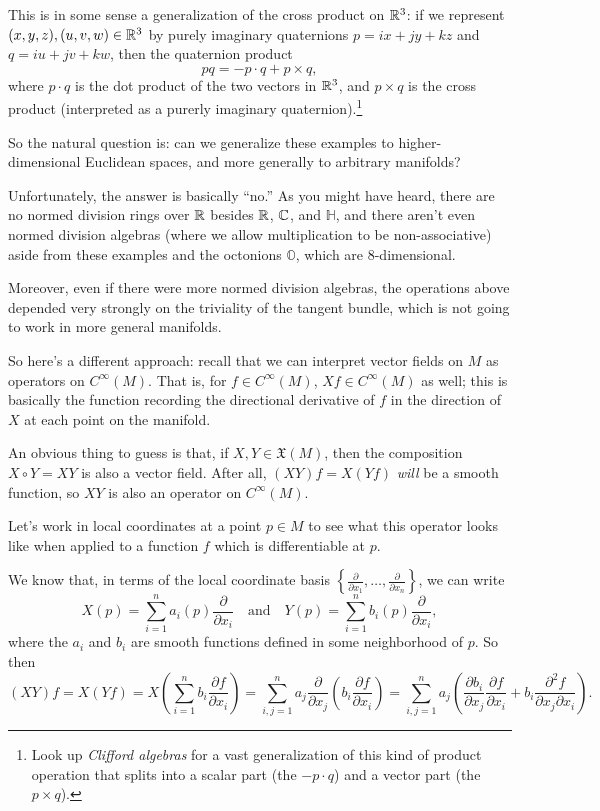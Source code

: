 \begin{itemize}
	This is in some sense a generalization of the cross product on $\mathbb{R}^3$: if we represent $(x,y,z),(u,v,w) \in \mathbb{R}^3$ by purely imaginary quaternions $p = ix + jy + kz$ and $q = iu + jv + kw$, then the quaternion product
	\[
		pq = -p \cdot q + p \times q,
	\]
	where $p \cdot q$ is the dot product of the two vectors in $\mathbb{R}^3$, and $p \times q$ is the cross product (interpreted as a purerly imaginary quaternion).\footnote{Look up \emph{Clifford algebras} for a vast generalization of this kind of product operation that splits into a scalar part (the $-p \cdot q$) and a vector part (the $p \times q$).}
\end{itemize}

So the natural question is: can we generalize these examples to higher-dimensional Euclidean spaces, and more generally to arbitrary manifolds?

Unfortunately, the answer is basically ``no.'' As you might have heard, there are no normed division rings over $\mathbb{R}$ besides $\mathbb{R}$, $\mathbb{C}$, and $\mathbb{H}$, and there aren't even normed division algebras (where we allow multiplication to be non-associative) aside from these examples and the octonions $\mathbb{O}$, which are 8-dimensional. 

Moreover, even if there were more normed division algebras, the operations above depended very strongly on the triviality of the tangent bundle, which is not going to work in more general manifolds.

So here's a different approach: recall that we can interpret vector fields on $M$ as operators on $C^\infty(M)$. That is, for $f \in C^\infty(M)$, $Xf \in C^\infty(M)$ as well; this is basically the function recording the directional derivative of $f$ in the direction of $X$ at each point on the manifold.

An obvious thing to guess is that, if $X,Y \in \mathfrak{X}(M)$, then the composition $X \circ Y = XY$ is also a vector field. After all, $(XY)f = X(Yf)$ \emph{will} be a smooth function, so $XY$ is also an operator on $C^\infty(M)$.

Let's work in local coordinates at a point $p \in M$ to see what this operator looks like when applied to a function $f$ which is differentiable at $p$.

We know that, in terms of the local coordinate basis $\left\{ \frac{\partial}{\partial x_1},\dots , \frac{\partial}{\partial x_n}\right\}$, we can write
\[
	X(p) = \sum_{i=1}^n a_i(p) \frac{\partial}{\partial x_i} \quad \text{and} \quad Y(p) = \sum_{i=1}^n b_i(p) \frac{\partial}{\partial x_i},
\]
where the $a_i$ and $b_i$ are smooth functions defined in some neighborhood of $p$. So then
\[
	(XY)f = X(Yf) = X\left(\sum_{i=1}^n b_i \frac{\partial f}{\partial x_i}\right) = \sum_{i,j=1}^n a_j \frac{\partial}{\partial x_j} \left( b_i \frac{\partial f}{\partial x_i}\right) = \sum_{i,j=1}^n a_j \left( \frac{\partial b_i}{\partial x_j}\frac{\partial f}{\partial x_i} + b_i \frac{\partial^2 f}{\partial x_j \partial x_i}\right).
\]

